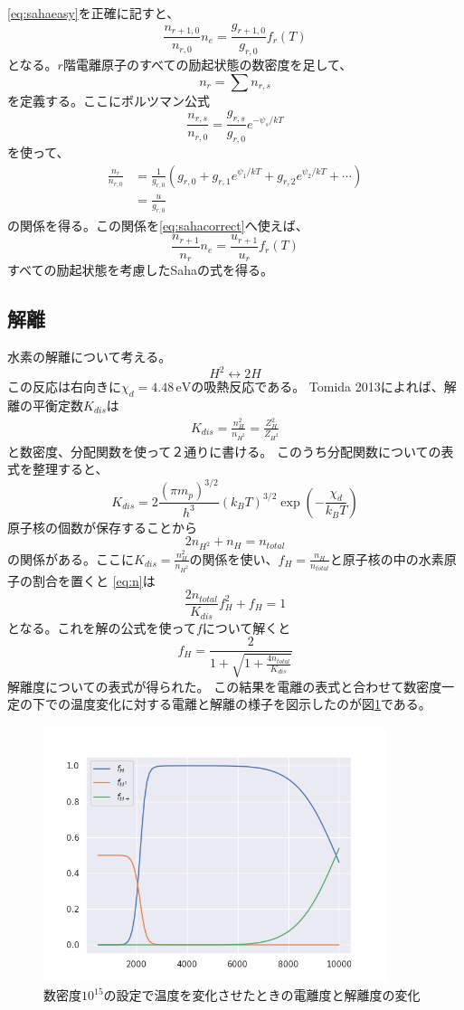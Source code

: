 \documentclass[a4j, dvipdfmx]{jsarticle}
\newcommand{\beq}{\begin{equation}}
\newcommand{\eeq}{\end{equation}}
\begin{document}
\eqref{eq:sahaeasy}を正確に記すと、
\beq
\frac{n_{r+1,0}}{n_{r,0}}n_e = \frac{g_{r+1,0}}{g_{r,0}} f_r(T)\label{eq:sahacorrect}
\eeq
となる。$r$階電離原子のすべての励起状態の数密度を足して、
\beq
n_r = \sum n_{r,s}
\eeq
を定義する。ここにボルツマン公式
\beq
\frac{n_{r,s}}{n_{r,0}} = \frac{g_{r,s}}{g_{r,0}} e^{-\psi_s/kT}
\eeq
を使って、
\begin{align}
    \frac{n_r}{n_{r,0}} &=
    \frac{1}{g_{r,0}}\left(g_{r,0} + g_{r, 1}e^{\psi_1/ kT}+ g_{r, 2}e^{\psi_2/ kT} + \cdots\right)\\
                        &= \frac{u}{g_{r,0}}
\end{align}
の関係を得る。この関係を\eqref{eq:sahacorrect}へ使えば、
\beq
\frac{n_{r+1}}{n_r}n_e = \frac{u_{r+1}}{u_r}f_r(T)\label{eq:saha}
\eeq
すべての励起状態を考慮したSahaの式を得る。
\subsection{解離}
水素の解離について考える。
\beq
H^2 \longleftrightarrow 2H
\eeq
この反応は右向きに$\chi_d = 4.48\,\mathrm{eV}$の吸熱反応である。
Tomida 2013\cite{tomida}によれば、解離の平衡定数$K_{dis}$は
\begin{align}
    K_{dis} = \frac{n^2_H}{n_{H^2}} = \frac{Z^2_H}{Z_{H^2}}
\end{align}
と数密度、分配関数を使って２通りに書ける。
このうち分配関数についての表式を整理すると、
\beq
K_{dis} = 2 \frac{(\pi m_p)^{3/2}}{h^3}(k_B T)^{3/2} \exp(-\frac{\chi_d}{k_BT})
\eeq
原子核の個数が保存することから
\beq
2n_{H^2} + n_H = n_{total}\label{eq:n}
\eeq
の関係がある。ここに$K_{dis} = \frac{n^2_H}{n_{H^2}}$の関係を使い、$f_H = \frac{n_H}{n_{total}}$と原子核の中の水素原子の割合を置くと
\eqref{eq:n}は
\beq
\frac{2n_{total}}{K_{dis}} f_H^2 + f_H = 1
\eeq
となる。これを解の公式を使って$f$について解くと
\beq
f_H = \frac{2}{1 + \sqrt{1 + \frac{4 n_{total}}{K_{dis}}}}
\eeq
解離度についての表式が得られた。
この結果を電離の表式と合わせて数密度一定の下での温度変化に対する電離と解離の様子を図示したのが図\ref{fig:fh}である。
\begin{figure}[H]
    \includegraphics[clip,width=10.0cm]{graph/fh.png}
    \caption{数密度$10^{15}$の設定で温度を変化させたときの電離度と解離度の変化}
    \label{fig:fh}
\end{figure}
\end{document}
